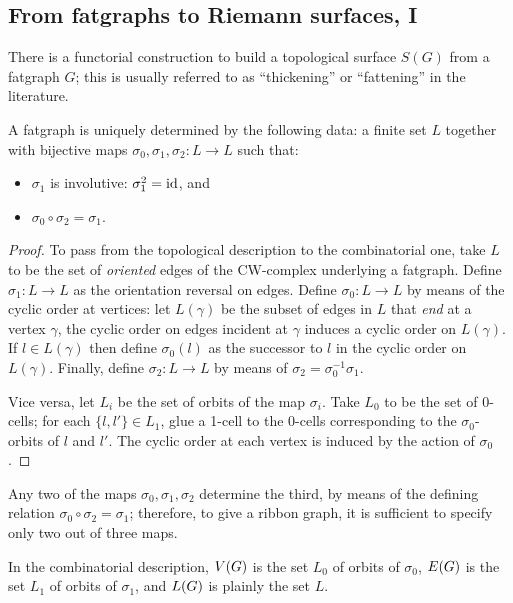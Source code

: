 \subsection{From fatgraphs to Riemann surfaces, I}
\label{sec:rg-to-surfaces}

There is a functorial construction to build a topological surface
$S(G)$ from a fatgraph $G$; this is usually referred to as
``thickening'' or ``fattening'' in the literature.

\begin{lemma}
  A fatgraph is uniquely determined by the following data: a
  finite set $L$ together with bijective maps $\sigma_0, \sigma_1, \sigma_2: L \to L$ such
  that:
  \begin{itemize}
  \item $\sigma_1$ is involutive: $\sigma_1^2 = \operatorname{id}$, and
  \item $\sigma_0 \circ \sigma_2 = \sigma_1$.
  \end{itemize}
\end{lemma}
\begin{proof}
  To pass from the topological description to the combinatorial one,
  take $L$ to be the set of \emph{oriented} edges of the CW-complex
  underlying a fatgraph.  Define $\sigma_1:L\to L$ as the orientation
  reversal on edges.  Define $\sigma_0:L\to L$ by means of the cyclic order
  at vertices: let $L(\gamma)$ be the subset of edges in $L$ that
  \emph{end} at a vertex $\gamma$, the cyclic order on edges incident at
  $\gamma$ induces a cyclic order on $L(\gamma)$.  If $l\in L(\gamma)$ then
  define $\sigma_0(l)$ as the successor to $l$ in the cyclic order on
  $L(\gamma)$.  Finally, define $\sigma_2: L \to L$ by means of
  $\sigma_2=\sigma_0^{-1}\sigma_1$.

  Vice versa, let $L_i$ be the set of orbits of the map $\sigma_i$.  Take
  $L_0$ to be the set of 0-cells; for each $\{l,l'\} \in L_1$, glue a
  1-cell to the 0-cells corresponding to the $\sigma_0$-orbits of $l$ and
  $l'$.  The cyclic order at each vertex is induced by the action of
  $\sigma_0$.
\end{proof}
Any two of the maps $\sigma_0, \sigma_1, \sigma_2$ determine the third, by means of
the defining relation $\sigma_0 \circ \sigma_2 = \sigma_1$; therefore, to give a ribbon
graph, it is sufficient to specify only two out of three maps.

In the combinatorial description, $V(G)$ is the set $L_0$ of
orbits of $\sigma_0$, $E(G)$ is the set $L_1$ of orbits of $\sigma_1$, and
$L(G)$ is plainly the set $L$.  

